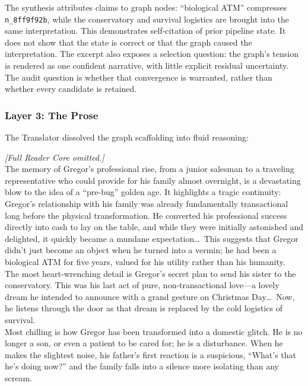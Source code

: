 \documentclass[11pt]{article}
\begin{document}
The synthesis attributes claims to graph nodes: ``biological ATM'' compresses
\texttt{n\_8ff9f92b}, while the conservatory and survival logistics are brought
into the same interpretation. This demonstrates self-citation of prior pipeline
state. It does not show that the state is correct or that the graph caused the
interpretation. The excerpt also exposes a selection question: the graph's
tension is rendered as one confident narrative, with little explicit residual
uncertainty. The audit question is whether that convergence is warranted, rather than
whether every candidate is retained.

\subsubsection{Layer 3: The Prose}

The Translator dissolved the graph scaffolding into fluid reasoning:

\begin{metabox}
\textrm{\textit{[Full Reader Core omitted.]}}\\[1em]
The memory of Gregor's professional rise, from a junior salesman to a traveling representative who could provide for his family almost overnight, is a devastating blow to the idea of a ``pre-bug'' golden age. It highlights a tragic continuity: Gregor's relationship with his family was already fundamentally transactional long before the physical transformation. He converted his professional success directly into cash to lay on the table, and while they were initially astonished and delighted, it quickly became a mundane expectation\ldots\ This suggests that Gregor didn't just become an object when he turned into a vermin; he had been a biological ATM for five years, valued for his utility rather than his humanity.\\[0.5em]
The most heart-wrenching detail is Gregor's secret plan to send his sister to the conservatory. This was his last act of pure, non-transactional love---a lovely dream he intended to announce with a grand gesture on Christmas Day\ldots\ Now, he listens through the door as that dream is replaced by the cold logistics of survival.\\[0.5em]
Most chilling is how Gregor has been transformed into a domestic glitch. He is no longer a son, or even a patient to be cared for; he is a disturbance. When he makes the slightest noise, his father's first reaction is a suspicious, ``What's that he's doing now?'' and the family falls into a silence more isolating than any scream.
\end{metabox}
\end{document}
